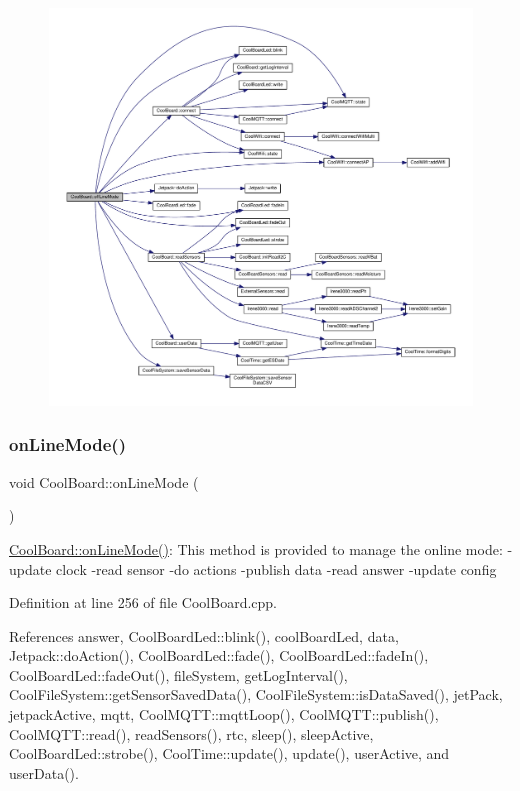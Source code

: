 \begin{figure}[H]
\begin{center}
\leavevmode
\includegraphics[width=350pt]{classCoolBoard_ae6b5e1274d760462290192acea4adca8_cgraph}
\end{center}
\end{figure}
\mbox{\label{classCoolBoard_aa0bbc4bc605e35618d18e68795c61363}} 
\subsubsection{\texorpdfstring{on\+Line\+Mode()}{onLineMode()}}
{\footnotesize\ttfamily void Cool\+Board\+::on\+Line\+Mode (\begin{DoxyParamCaption}{ }\end{DoxyParamCaption})}

\hyperlink{classCoolBoard_aa0bbc4bc605e35618d18e68795c61363}{Cool\+Board\+::on\+Line\+Mode()}\+: This method is provided to manage the online mode\+: -\/update clock -\/read sensor -\/do actions -\/publish data -\/read answer -\/update config 

Definition at line 256 of file Cool\+Board.\+cpp.



References answer, Cool\+Board\+Led\+::blink(), cool\+Board\+Led, data, Jetpack\+::do\+Action(), Cool\+Board\+Led\+::fade(), Cool\+Board\+Led\+::fade\+In(), Cool\+Board\+Led\+::fade\+Out(), file\+System, get\+Log\+Interval(), Cool\+File\+System\+::get\+Sensor\+Saved\+Data(), Cool\+File\+System\+::is\+Data\+Saved(), jet\+Pack, jetpack\+Active, mqtt, Cool\+M\+Q\+T\+T\+::mqtt\+Loop(), Cool\+M\+Q\+T\+T\+::publish(), Cool\+M\+Q\+T\+T\+::read(), read\+Sensors(), rtc, sleep(), sleep\+Active, Cool\+Board\+Led\+::strobe(), Cool\+Time\+::update(), update(), user\+Active, and user\+Data().


